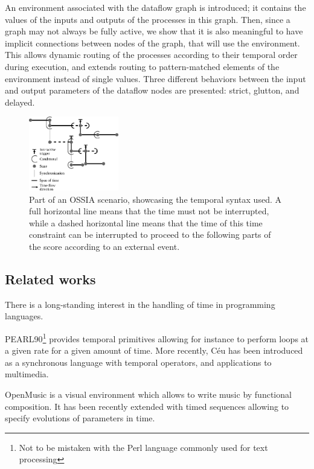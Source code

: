 \documentclass{article}
\begin{document}
An environment associated with the dataflow graph is introduced; it contains the values of the inputs and outputs of the processes in this graph.
Then, since a graph may not always be fully active, we show that it is also meaningful to have implicit connections between nodes of the graph, that will use the environment.
This allows dynamic routing of the processes according to their temporal order during execution, and extends routing to pattern-matched elements of the environment instead of single values.
Three different behaviors between the input and output parameters of the dataflow nodes are presented: strict, glutton, and delayed. 

\begin{figure} [h]
	\centering
	\includegraphics[width=0.35\textwidth]{images/iscore-example.eps}
	\caption{Part of an OSSIA scenario, showcasing the temporal syntax used. 
		A full horizontal line means that the time must not be interrupted, 
		while a dashed horizontal line means that the time of this time constraint can be interrupted to proceed 
		to the following parts of the score according to an external event.}
	\label{fig.iscore-example}
\end{figure}

\subsection{Related works}
There is a long-standing interest in the handling of time in programming languages.

PEARL90\cite{halang2001safe}\footnote{Not to be mistaken with the Perl language commonly used for text processing} provides temporal primitives allowing for instance to perform loops at a given rate for a given amount of time.
More recently, Céu has been introduced as a synchronous language with temporal operators, and applications to multimedia\cite{Santos:2016:CLI:2976796.2976856}.

OpenMusic is a visual environment which allows to write music by functional composition.
It has been recently extended with timed sequences allowing to specify evolutions of parameters in time\cite{garcia:hal-01484077}.
\end{document}

